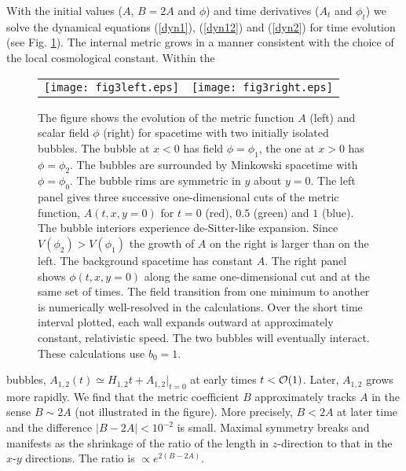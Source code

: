\documentclass[preprintnumbers,eqsecnum,aps,prd,epsf,showpacs,nofootinbib
]{revtex4}
\begin{document}
With the initial values ($A$, $B=2A$ and $\phi$) and time derivatives
($A_t$ and $\phi_t$) we solve the dynamical equations (\ref{dyn1}),
(\ref{dyn12}) and (\ref{dyn2}) for time evolution (see
Fig. \ref{fig-nonbst1}).  The internal metric grows in a manner
consistent with the choice of the local cosmological constant. Within
the
\begin{figure}[htbp]
\begin{center}
\begin{tabular}{ll}
\texttt{[image: fig3left.eps]} &  
\hspace{0.5cm}
\texttt{[image: fig3right.eps]}
\end{tabular}
\end{center}
\caption{The figure shows the evolution of the metric function $A$
  (left) and scalar field $\phi$ (right) for spacetime with two
  initially isolated bubbles. The bubble at $x<0$ has field
  $\phi=\phi_1$, the one at $x>0$ has $\phi=\phi_2$. The bubbles are
  surrounded by Minkowski spacetime with $\phi=\phi_0$. The bubble
  rims are symmetric in $y$ about $y=0$.  The left panel gives three
  successive one-dimensional cuts of the metric function, $A(t,x,y=0)$
  for $t=0$ (red), $0.5$ (green) and $1$ (blue). The bubble interiors experience
  de-Sitter-like expansion.  Since $V(\phi_2) > V(\phi_1)$ the growth
  of $A$ on the right is larger than on the left. The background
  spacetime has constant $A$. The right panel shows $\phi(t,x,y=0)$
  along the same one-dimensional cut and at the same set of times. The
  field transition from one minimum to another is numerically
  well-resolved in the calculations. Over the short time interval plotted,
  each wall expands outward at approximately constant, relativistic
  speed. The two bubbles will eventually interact. These calculations
  use $b_0=1$.}
\label{fig-nonbst1}
\end{figure}
bubbles, $A_{1,2}(t) \simeq H_{1,2} t+A_{1,2}|_{t=0}$ at early times
$t<{\cal O}(1)$.  Later, $A_{1,2}$ grows more rapidly.  We find that
the metric coefficient $B$ approximately tracks $A$ in the sense $B
\sim 2A$ (not illustrated in the figure).  More precisely, $B < 2A$ at
later time and the difference $|B-2A| < 10^{-2}$ is small.  Maximal
symmetry breaks and manifests as the shrinkage of the ratio of the
length in $z$-direction to that in the $x$-$y$ directions. The ratio
is $\propto e^{2(B-2A)}$.
\end{document}
